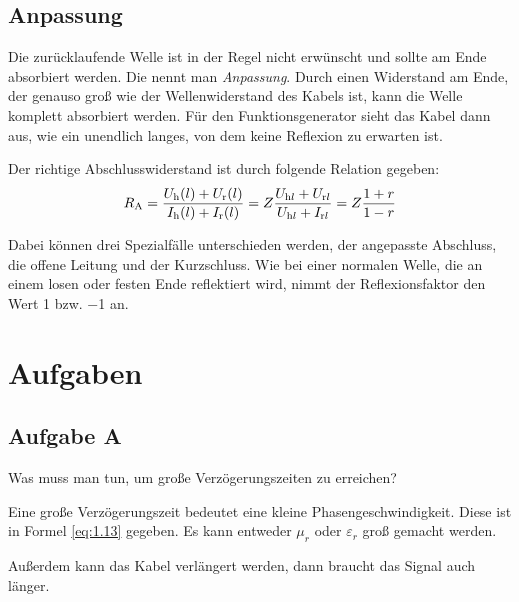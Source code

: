 \subsection{Anpassung}

Die zurücklaufende Welle ist in der Regel nicht erwünscht und sollte am Ende
absorbiert werden. Die nennt man \emph{Anpassung}. Durch einen Widerstand am
Ende, der genauso groß wie der Wellenwiderstand des Kabels ist, kann die Welle
komplett absorbiert werden. Für den Funktionsgenerator sieht das Kabel dann
aus, wie ein unendlich langes, von dem keine Reflexion zu erwarten ist. 

Der richtige Abschlusswiderstand ist durch folgende Relation gegeben:
\begin{equation}
	\label{eq:1.17}
	R_\text A
	= \frac{U_\text h (l) + U_\text r (l)}{I_\text h (l) + I_\text r (l)}
	= Z \frac{U_{\text h l} + U_{\text r l}}{U_{\text h l} + I_{\text r l}}
	= Z \frac{1+r}{1-r}
\end{equation}

Dabei können drei Spezialfälle unterschieden werden, der angepasste Abschluss,
die offene Leitung und der Kurzschluss. Wie bei einer normalen Welle, die an
einem losen oder festen Ende reflektiert wird, nimmt der Reflexionsfaktor den
Wert \num{+1} bzw. \num{-1} an.


\section{Aufgaben}

\subsection{Aufgabe A}

\begin{problem}
	Was muss man tun, um große Verzögerungszeiten zu erreichen?
\end{problem}

Eine große Verzögerungszeit bedeutet eine kleine Phasengeschwindigkeit. Diese
ist in Formel \eqref{eq:1.13} gegeben. Es kann entweder $\mu_r$ oder
$\varepsilon_r$ groß gemacht werden.

Außerdem kann das Kabel verlängert werden, dann braucht das Signal auch länger.

